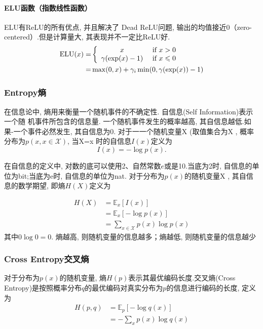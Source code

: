 \documentclass[a4paper]{article}
\theoremstyle{definition}
\numberwithin{equation}{section}
\begin{document}
\paragraph{ELU函数（指数线性函数）}
ELU有ReLU的所有优点, 并且解决了 Dead ReLU问题, 输出的均值接近0（zero-centered）.但是计算量大, 其表现并不一定比ReLU好.
\begin{align*}
    \mathrm{ELU}(x)= &
    \left\{ 
    \begin{array}{c c}    
        x  \ & \text{if} \  x>0 \\    
        \gamma(\exp(x)-1) \ & \text{if} \ x \leqslant 0  \\   
    \end{array} 
    \right. \\
    = & \max(0, x)+\gamma_i \min(0, \gamma(\exp(x))-1)
    \end{align*}
      

\subsubsection{Entropy熵}
在信息论中, 熵用来衡量一个随机事件的不确定性.
 自信息(Self Information)表示一个随 机事件所包含的信息量. 一个随机事件发生的概率越高, 其自信息越低.如果-一个事件必然发生, 其自信息为0.
 对于一一个随机变量X (取值集合为X , 概率分布为$p(x,  x \in \mathcal{X})$, 当X=x
 时的自信息$I(x)$定义为
 \begin{equation}
      I(x)=- \log p(x).
 \end{equation} 
 
 在自信息的定义中, 对数的底可以使用2、自然常数$e$或是10.当底为2时, 自信息的单位为bit;当底为e时, 自信息的单位为nat.
 对于分布为$p(x)$的随机变量X , 其自信息的数学期望, 即熵$H(X)$定义为
 
 \begin{equation}
    \begin{split}
 H(X) &= \mathbb{E}_x\left[  I(x)\right] \\
 &= \mathbb{E}_x \left[  -\log p(x) \right] \\
 &=\sum_{x \in \mathcal{X}}p(x) \log p(x)    
\end{split}
 \end{equation}
 其中$ 0 \log 0= 0 $.
 熵越高, 则随机变量的信息越多；熵越低, 则随机变量的信息越少

\subsubsection{Cross Entropy交叉熵}
对于分布为$p(x)$的随机变量, 熵$H(p)$表示其最优编码长度.交叉熵(Cross Entropy)是按照概率分布$q$的最优编码对真实分布为$p$的信息进行编码的长度, 定义为 
\begin{equation}
 \begin{split}
        H(p, q)&= \mathbb{E}_p \left[ -\log q(x) \right]  \\
        &= - \sum_x p(x) \log q(x) 
 \end{split}
\end{equation}
 
\end{document}
